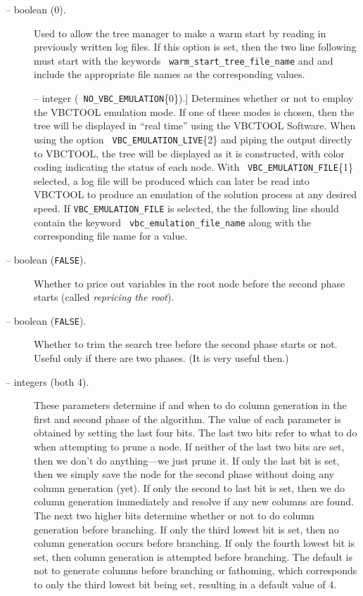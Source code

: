\begin{description}
\item[ -- boolean (0).] 
Used to allow the tree manager to make a warm start by reading in
previously written log files. If this option is set, then the two line
following must start with the keywords {\tt
warm\_start\_tree\_file\_name} and 
and include the appropriate file names as the corresponding values.

\item[] -- integer ({\tt
NO\_VBC\_EMULATION}\{0\}).] 
Determines whether or not to employ the VBCTOOL emulation mode. If
one of these modes is chosen, then the tree will be displayed in
``real time'' using the VBCTOOL Software. When using the option {\tt
VBC\_EMULATION\_LIVE}\{2\} and piping the output directly to VBCTOOL, the
tree will be displayed as it is constructed, with color coding
indicating the status of each node. With {\tt
VBC\_EMULATION\_FILE}\{1\} selected, a log file will be produced which
can later be read into VBCTOOL to produce an emulation of the
solution process at any desired speed. If {\tt VBC\_EMULATION\_FILE}
is selected, the the following line should contain the keyword {\tt
vbc\_emulation\_file\_name} along with the corresponding file name
for a value.

\item[ -- boolean ({\tt FALSE}).] 
Whether to price out variables in the root node before the second
phase starts (called {\em repricing the root}). 

\item[ -- boolean ({\tt FALSE}).] 
Whether to trim the search tree before the second phase starts or not. Useful
only if there are two phases. (It is very useful then.)

\item[ --
integers (both 4).] 
These parameters determine if and when to do
column generation in the first and second phase of the algorithm. The
value of each parameter is obtained by setting the last four bits.
The last two bits refer to what to do when attempting to prune a node.
If neither of the last two bits are set, then we don't do
anything---we just prune it. If only the last bit is set, then we
simply save the node for the second phase without doing any column
generation (yet). If only the second to last bit is set, then we do
column generation immediately and resolve if any new columns are
found. The next two higher bits determine whether or not to do column
generation before branching. If only the third lowest bit is set, then no
column generation occurs before branching. If only the fourth lowest bit is
set, then column generation is attempted before branching. The default
is not to generate columns before branching or fathoming, which
corresponds to only the third lowest bit being set, resulting in a
default value of 4.


\end{description}
